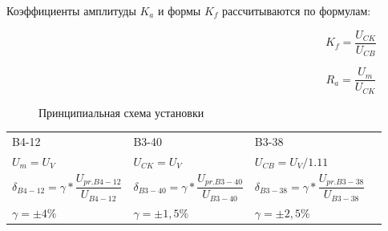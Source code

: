 \vspace{4mm}

Коэффициенты амплитуды $ K_{a} $ и формы $ K_{f} $ рассчитываются по формулам:

\begin{equation*}
  \label{eq:equation6}
  K_{f} = \dfrac{U_{CK}}{U_{CB}}
\end{equation*}

\begin{equation*}
  \label{eq:equation4}
  R_{a} = \dfrac{U_{m}}{U_{CK}}
\end{equation*}

\begin{figure}[h]
  \caption{Принципиальная схема установки}
\end{figure}


\vspace{4mm}

\begin{table} [htbp]
  \begin{center}
    \begin{tabular}{ p{5cm} p{5cm} p{5cm}l }

      \centering B4-12 \par &\centering B3-40 &\centering B3-38 & \\
      \centering $ U_{m} = U_{V} $ \par &\centering $ U_{CK} = U_{V} $ &\centering $ U_{CB} = U_{V}/1.11 $ & \\
      \centering $ \delta_{B4-12} = \gamma * \dfrac{U_{pr. B4-12}}{U_{B4-12}} $ \par
      &\centering $ \delta_{B3-40} = \gamma * \dfrac{U_{pr. B3-40}}{U_{B3-40}} $ 
      &\centering $ \delta_{B3-38} = \gamma * \dfrac{U_{pr. B3-38}}{U_{B3-38}}$ & \\

      \centering $ \gamma = \pm 4 \% $ &\centering $ \gamma = \pm 1,5 \% $ \par &\centering $ \gamma = \pm 2,5 \% $ \\ 

    \end{tabular}
  \end{center}
\end{table}



\clearpage
